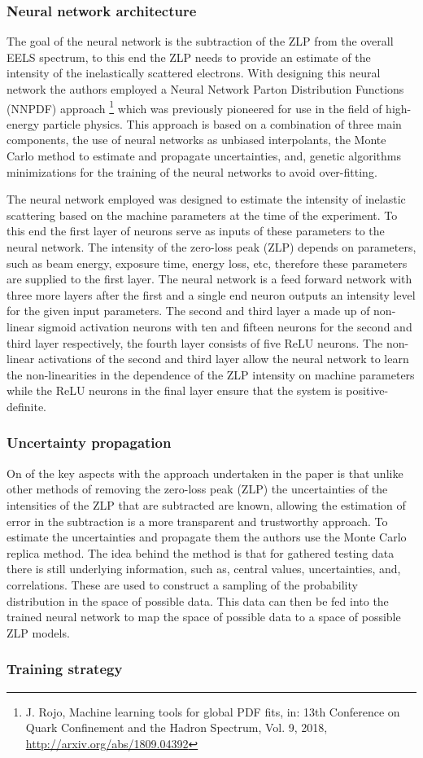 \documentclass[a4paper]{scrartcl}
\begin{document}
\subsubsection*{Neural network architecture}
The goal of the neural network is the subtraction of the ZLP from the overall EELS spectrum, to this end the ZLP needs to provide an estimate of the intensity of the inelastically scattered electrons. With designing this neural network the authors employed a Neural Network Parton Distribution Functions (NNPDF) approach \footnote{ J. Rojo, Machine learning tools for global PDF fits, in: 13th Conference on Quark Confinement and the Hadron Spectrum, Vol. 9, 2018, \href{http://arxiv.org/abs/1809.04392}{http://arxiv.org/abs/1809.04392}} which was previously pioneered for use in the field of high-energy particle physics. This approach is based on a combination of three main components, the use of neural networks as unbiased interpolants, the Monte Carlo method to estimate and propagate uncertainties, and, genetic algorithms minimizations for the training of the neural networks to avoid over-fitting.

The neural network employed was designed to estimate the intensity of inelastic scattering based on the machine parameters at the time of the experiment. To this end the first layer of neurons serve as inputs of these parameters to the neural network. The intensity of the zero-loss peak (ZLP) depends on parameters, such as beam energy, exposure time, energy loss, etc, therefore these parameters are supplied to the first layer. The neural network is a feed forward network with three more layers after the first and a single end neuron outputs an intensity level for the given input parameters. The second and third layer a made up of non-linear sigmoid activation neurons with ten and fifteen neurons for the second and third layer respectively, the fourth layer consists of five ReLU neurons. The non-linear activations of the second and third layer allow the neural network to learn the non-linearities in the dependence of the ZLP intensity on machine parameters while the ReLU neurons in the final layer ensure that the system is positive-definite.

\subsubsection*{Uncertainty propagation}
On of the key aspects with the approach undertaken in the paper is that unlike other methods of removing the zero-loss peak (ZLP) the uncertainties of the intensities of the ZLP that are subtracted are known, allowing the estimation of error in the subtraction is a more transparent and trustworthy approach.
To estimate the uncertainties and propagate them the authors use the Monte Carlo replica method. The idea behind the method is that for gathered testing data there is still underlying information, such as, central values, uncertainties, and, correlations. These are used to construct a sampling of the probability distribution in the space of possible data. This data can then be fed into the trained neural network to map the space of possible data to a space of possible ZLP models.

\subsubsection*{Training strategy}
\end{document}
